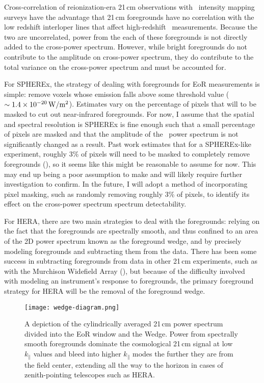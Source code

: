 \label{sec:foregrounds}

Cross-correlation of reionization-era 21\,cm observations with \lya\ intensity
mapping surveys have the advantage that 21\,cm foregrounds have no correlation with
the low redshift interloper lines that affect high-redshift \lya\ measurements.
Because the two are uncorrelated, power from the each of these foregrounds is not directly
added to the cross-power spectrum. However, while bright foregrounds do not contribute
to the amplitude on cross-power spectrum, they do contribute to the total variance
on the cross-power spectrum and must be accounted for.

For SPHEREx, the strategy of dealing with foregrounds for EoR measurements is simple:
remove voxels whose emission falls above some threshold value ($\sim 1.4 \times 10^{-20} \, \rm W / m^2$).
Estimates vary on the percentage of pixels that will to be masked to cut out near-infrared foregrounds.
For now, I assume that the spatial and spectral resolution is SPHEREx is fine enough
such that a small percentage of pixels are masked and that the amplitude of the
\lya\ power spectrum is not significantly changed as a result. Past
work estimates that for a SPHEREx-like experiment, roughly 3\% of pixels will need
to be masked to completely remove foregrounds (\cite{2014ApJ...785...72G}), so it seems like this might be reasonable
to assume for now. This may end up being a poor assumption to make and will likely require
further investigation to confirm. In the future, I will adopt a method of incorporating
pixel masking, such as randomly removing roughly 3\% of pixels, to identify its effect on the
cross-power spectrum spectrum detectability.

For HERA, there are two main strategies to deal with the foregrounds:
relying on the fact that the foregrounds are spectrally smooth, and thus confined
to an area of the 2D power spectrum known as the foreground wedge, and by precisely modeling
foregrounds and subtracting them from the data. There has been some success in subtracting
foregrounds from data in other 21\,cm experiments, such as with the Murchison Widefield Array (\cite{2019ApJ...884....1B}),
but because of the difficulty involved with modeling an instrument's response to foregrounds,
the primary foreground strategy for HERA will be the removal of the foreground wedge.

\begin{figure}[ht]
	\centering
	\texttt{[image: wedge-diagram.png]}
	\caption[Foreground Wedge]{A depiction of the cylindrically averaged 21\,cm power spectrum divided into
					the EoR window and the Wedge. Power from spectrally smooth foregrounds dominate the cosmological
					21\,cm signal at low $k_{\parallel}$ values and bleed into higher $k_{\parallel}$ modes the further
					they are from the field center, extending all the way to the horizon in cases of zenith-pointing
					telescopes such as HERA.}
	\label{fig:wedge}
\end{figure}

